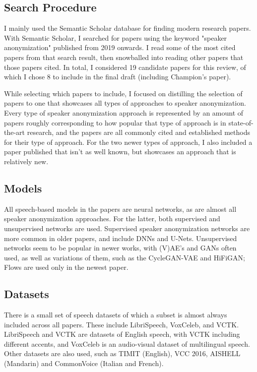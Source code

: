 \documentclass{Interspeech2024}
\begin{document}
\subsection{Search Procedure}
I mainly used the Semantic Scholar database for finding modern research papers.
With Semantic Scholar, I searched for papers using the keyword "speaker anonymization" published from 2019 onwards.
I read some of the most cited papers from that search result, then snowballed into reading other papers that those papers cited.
In total, I considered 19 candidate papers for this review, of which I chose 8 to include in the final draft (including Champion's \cite{champion_2023_thesis} paper).

While selecting which papers to include, I focused on distilling the selection of papers to one that showcases all types of approaches to speaker anonymization.
Every type of speaker anonymization approach is represented by an amount of papers roughly corresponding to how popular that type of approach is in state-of-the-art research, and the papers are all commonly cited and established methods for their type of approach.
For the two newer types of approach, I also included a paper published that isn't as well known, but showcases an approach that is relatively new.

\subsection{Models}
All speech-based models in the papers are neural networks, as are almost all speaker anonymization approaches.
For the latter, both supervised and unsupervised networks are used.
Supervised speaker anonymization networks are more common in older papers, and include DNNs and U-Nets.
Unsupervised networks seem to be popular in newer works, with (V)AE's and GANs often used, as well as variations of them, such as the CycleGAN-VAE and HiFiGAN; Flows are used only in the newest paper.

\subsection{Datasets}
There is a small set of speech datasets of which a subset is almost always included across all papers.
These include LibriSpeech, VoxCeleb, and VCTK.
LibriSpeech and VCTK are datasets of English speech, with VCTK including different accents, and VoxCeleb is an audio-visual dataset of multilingual speech.
Other datasets are also used, such as TIMIT (English), VCC 2016, AISHELL (Mandarin) and CommonVoice (Italian and French).
\end{document}
